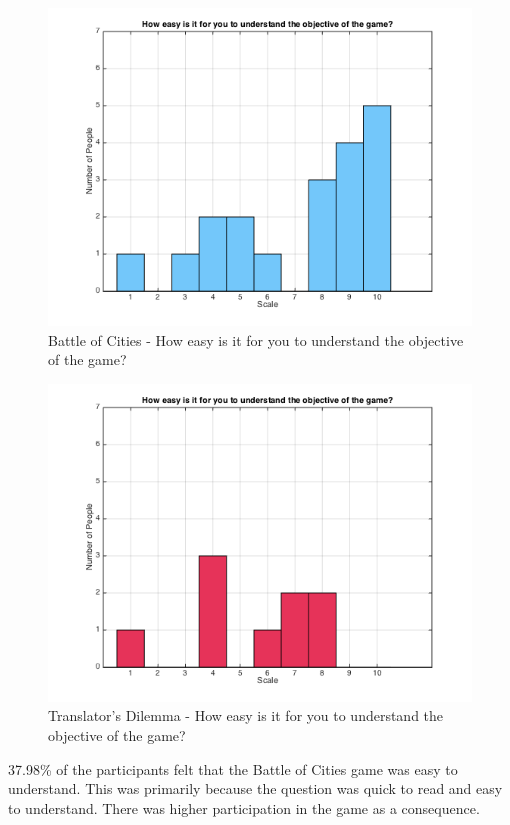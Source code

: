 \documentclass{sig-alternate}
\begin{document}
\begin{figure}
	\includegraphics[width=\linewidth]{p_easy_understand.png}
	\caption{Battle of Cities - How easy is it for you to understand the objective of the game?}
	\label{fig:p_easy_understand}
\end{figure}

\begin{figure}
	\includegraphics[width=\linewidth]{t_easy_understand.png}
	\caption{Translator's Dilemma - How easy is it for you to understand the objective of the game?}
	\label{fig:t_easy_understand}
\end{figure}

37.98\% of the participants felt that the Battle of Cities game was easy to understand. This was primarily because the question was quick to read and easy to understand. There was higher participation in the game as a consequence. 
\end{document}
